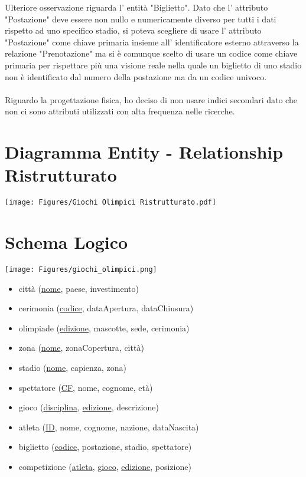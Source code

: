 \documentclass[paper=a4, fontsize=12 pt]{scrartcl} %
\begin{document}
	Ulteriore osservazione riguarda l' entità "Biglietto". Dato che l' attributo "Postazione" deve essere non nullo e numericamente diverso per tutti i dati rispetto ad uno specifico stadio, si poteva scegliere di usare l' attributo "Postazione" come chiave primaria insieme all' identificatore esterno attraverso la relazione "Prenotazione" ma si è comunque scelto di usare un codice come chiave primaria per rispettare più una visione reale nella quale un biglietto di uno stadio non è identificato dal numero della postazione ma da un codice univoco.\\\\
	Riguardo la progettazione fisica, ho deciso di non usare indici secondari dato che non ci sono attributi utilizzati con alta frequenza nelle ricerche.
	
	
	\newpage
	\section{Diagramma Entity - Relationship Ristrutturato}
	
	
	\texttt{[image: Figures/Giochi Olimpici Ristrutturato.pdf]}
	
	
	\newpage
	
	
	
	\section{Schema Logico}
	
	\texttt{[image: Figures/giochi\_olimpici.png]}
	
	\begin{itemize}
		\item città (\underline{nome}, paese, investimento)
		\item cerimonia (\underline{codice}, dataApertura, dataChiusura)
		\item olimpiade (\underline{edizione}, mascotte, sede, cerimonia)
		\item zona (\underline{nome}, zonaCopertura, città)
		\item stadio (\underline{nome}, capienza, zona)
		\item spettatore (\underline{CF}, nome, cognome, età)
		\item gioco (\underline{disciplina}, \underline{edizione}, descrizione)
		\item atleta (\underline{ID}, nome, cognome, nazione, dataNascita)
		\item biglietto (\underline{codice}, postazione, stadio, spettatore)
		\item competizione (\underline{atleta}, \underline{gioco}, \underline{edizione}, posizione) \\\\
	\end{itemize}
	
\end{document}
